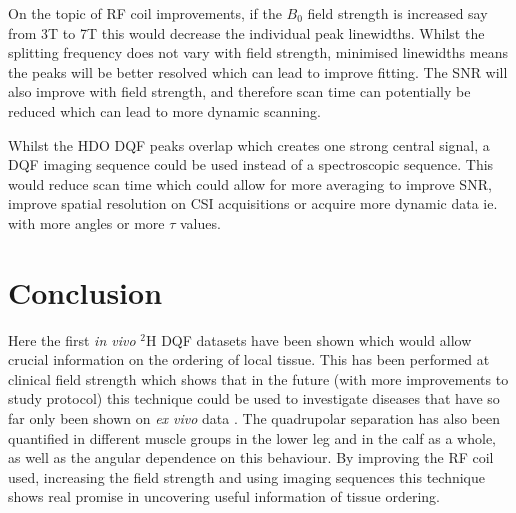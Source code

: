 On the topic of \ac{RF} coil improvements, if the $B_0$ field strength is increased say from 3T to 7T this would decrease the individual peak linewidths. Whilst the splitting frequency does not vary with field strength, minimised linewidths means the peaks will be better resolved which can lead to improve fitting. The \ac{SNR} will also improve with field strength, and therefore scan time can potentially be reduced which can lead to more dynamic scanning.

Whilst the \ac{HDO} \ac{DQF} peaks overlap which creates one strong central signal, a \ac{DQF} imaging sequence could be used instead of a spectroscopic sequence. This would reduce scan time which could allow for more averaging to improve \ac{SNR}, improve spatial resolution on \ac{CSI} acquisitions or acquire more dynamic data ie. with more angles or more $\tau$ values.

\section{Conclusion}

Here the first \textit{in vivo} $^2$H \ac{DQF} datasets have been shown which would allow crucial information on the ordering of local tissue. This has been performed at clinical field strength which shows that in the future (with more improvements to study protocol) this technique could be used to investigate diseases that have so far only been shown on \textit{ex vivo} data \cite{Ooms2015DoubleTissue, Sharf1995DetectionNMR-Spectroscopy, Perea20072HDisc, Sun2010InvestigationNMR}. The quadrupolar separation has also been quantified in different muscle groups in the lower leg and in the calf as a whole, as well as the angular dependence on this behaviour. By improving the \ac{RF} coil used, increasing the field strength and using imaging sequences this technique shows real promise in uncovering useful information of tissue ordering.


% 